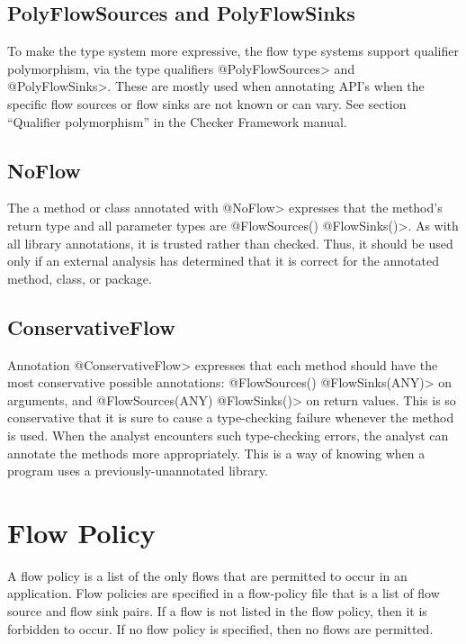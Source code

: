 \subsection{PolyFlowSources  and PolyFlowSinks}

To make the type system more expressive, the flow type systems support
qualifier polymorphism, via the type qualifiers \<@PolyFlowSources> and
\<@PolyFlowSinks>.  These are mostly used when annotating API's when the
 specific flow sources or flow sinks are not known or can vary. 
See section ``Qualifier polymorphism'' in the Checker Framework manual.  

\subsection{NoFlow}
The a method or class annotated with \<@NoFlow> expresses that the 
method's return type and all parameter types are \<@FlowSources({}) @FlowSinks({})>.  As with all
library annotations, it is trusted rather than checked.  Thus, it should be
used only if an external analysis has determined that it is correct for the
annotated method, class, or package.

\subsection{ConservativeFlow}

Annotation \<@ConservativeFlow> expresses that each method should have the
most conservative possible annotations:
  \<@FlowSources({}) @FlowSinks(ANY)> on arguments, and
  \<@FlowSources(ANY) @FlowSinks({})> on return values.
This is so conservative that it is sure to cause a type-checking failure
whenever the method is used.
When the analyst encounters such type-checking errors, the analyst can
annotate the methods more appropriately.  This is a way of knowing when a
program uses a previously-unannotated library.


\section{Flow Policy}
\label{sec:flowpolicy}

A flow policy is a list of the only flows that are permitted to occur in an application.
Flow policies are specified in a flow-policy file that is  a list 
 of flow source and flow sink pairs.  If a flow is not listed in the flow policy, then 
 it is forbidden to occur.  If no flow policy is specified, then no flows are permitted. 

